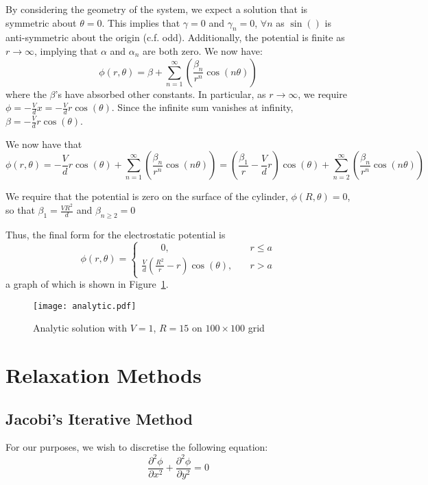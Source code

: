 \documentclass[12pt, a4paper]{article}
\newcommand{\be}{\begin{equation}}
\newcommand{\ee}{\end{equation}}
\begin{document}
By considering the geometry of the system, we expect a solution that is symmetric
about $\theta=0$. This implies that $\gamma = 0$ and $\gamma_n=0$, $\forall n$ as
$\sin()$ is anti-symmetric about the origin (c.f. odd). Additionally, the potential
is finite as $r \rightarrow \infty$, implying that $\alpha$ and $\alpha_n$ are both
zero. We now have:
%
\be
\phi(r,\theta)=\beta + \sum_{n=1}^{\infty}(\frac{\beta_n}{r^n} \cos(n\theta))
\ee
%
where the $\beta$'s have absorbed other constants. In particular, as
$r \rightarrow \infty$, we require $\phi=-\frac{V}{d}x=-\frac{V}{d}r\cos(\theta)$.
Since the infinite sum vanishes at infinity, $\beta=-\frac{V}{d}r\cos(\theta)$.

We now have that
%
\be
\phi(r,\theta)=-\frac{V}{d}r\cos(\theta) + \sum_{n=1}^{\infty}(\frac{\beta_n}{r^n} \cos(n\theta))
              =(\frac{\beta_1}{r}-\frac{V}{d}r)\cos(\theta) + \sum_{n=2}^{\infty}(\frac{\beta_n}{r^n} \cos(n\theta))
\ee

We require that the potential is zero on the surface of the cylinder,
$\phi(R,\theta)=0$, so that $\beta_1=\frac{VR^2}{d}$ and $\beta_{n \geq 2}=0$

Thus, the final form for the electrostatic potential is
%
\be
\phi(r,\theta)=
\begin{cases} \qquad 0, & \quad r \leq a \\
\frac{V}{d}(\frac{R^2}{r}-r)\cos(\theta), & \quad r > a
\end{cases}
\ee
%
a graph of which is shown in Figure~\ref{fig:analytic}.

\begin{figure}
\begin{center}
\texttt{[image: analytic.pdf]}
\caption{Analytic solution with $V=1$, $R=15$ on $100\times100$ grid}
\label{fig:analytic}
\end{center}
\end{figure}

\section{Relaxation Methods}

\subsection{Jacobi's Iterative Method}

For our purposes, we wish to discretise the following equation:
% 
\be 
\frac{\partial^2 \phi}{\partial x^2}+\frac{\partial^2 \phi}{\partial y^2} = 0
\label{eq:laplace}
\ee 
\end{document}
